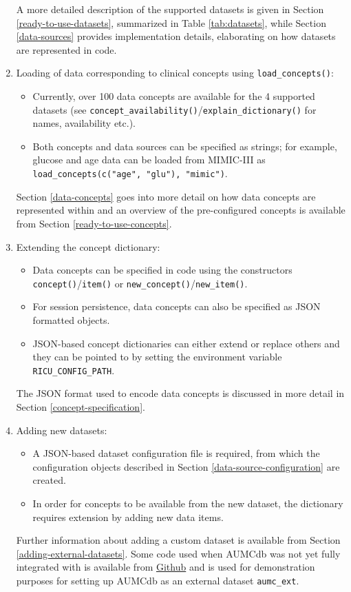 \documentclass[
  notitle]{jss}
\begin{document}
\begin{enumerate}
  A more detailed description of the supported datasets is given in
  Section \ref{ready-to-use-datasets}, summarized in Table
  \ref{tab:datasets}, while Section \ref{data-sources} provides
  implementation details, elaborating on how datasets are represented in
  code.
\item
  Loading of data corresponding to clinical concepts using
  \texttt{load\_concepts()}:

  \begin{itemize}
  \item
    Currently, over 100 data concepts are available for the 4 supported
    datasets (see
    \texttt{concept\_availability()}/\texttt{explain\_dictionary()} for
    names, availability etc.).
  \item
    Both concepts and data sources can be specified as strings; for
    example, glucose and age data can be loaded from MIMIC-III as
    \texttt{load\_concepts(c("age",\ "glu"),\ "mimic")}.
  \end{itemize}

  Section \ref{data-concepts} goes into more detail on how data concepts
  are represented within  and an overview of the
  pre-configured concepts is available from Section
  \ref{ready-to-use-concepts}.
\item
  Extending the concept dictionary:

  \begin{itemize}
  \item
    Data concepts can be specified in code using the constructors
    \texttt{concept()}/\texttt{item()} or
    \texttt{new\_concept()}/\texttt{new\_item()}.
  \item
    For session persistence, data concepts can also be specified as JSON
    formatted objects.
  \item
    JSON-based concept dictionaries can either extend or replace others
    and they can be pointed to by setting the environment variable
    \texttt{RICU\_CONFIG\_PATH}.
  \end{itemize}

  The JSON format used to encode data concepts is discussed in more
  detail in Section \ref{concept-specification}.
\item
  Adding new datasets:

  \begin{itemize}
  \item
    A JSON-based dataset configuration file is required, from which the
    configuration objects described in Section
    \ref{data-source-configuration} are created.
  \item
    In order for concepts to be available from the new dataset, the
    dictionary requires extension by adding new data items.
  \end{itemize}

  Further information about adding a custom dataset is available from
  Section \ref{adding-external-datasets}. Some code used when AUMCdb was
  not yet fully integrated with  is available from
  \href{https://github.com/eth-mds/aumc}{Github} and is used for
  demonstration purposes for setting up AUMCdb as an external dataset
  \texttt{aumc\_ext}.
\end{enumerate}
\end{document}
